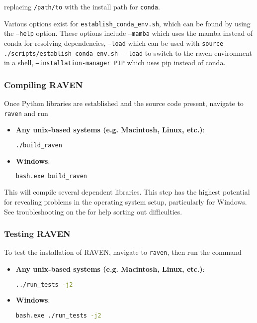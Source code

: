 replacing \texttt{/path/to} with the install path for \texttt{conda}.

\nb Various options exist for \texttt{establish\_conda\_env.sh}, which
can be found by using the \texttt{--help} option.  These options
include \texttt{--mamba} which uses the mamba instead of conda for
resolving dependencies, \texttt{--load} which can be used with
\verb'source ./scripts/establish_conda_env.sh --load' to switch to the
raven environment in a shell, \texttt{--installation-manager PIP} which
uses pip instead of conda.

\subsubsection{Compiling RAVEN}
Once Python libraries are established and the source code present, navigate to \texttt{raven} and run


\begin{itemize}

  \item \textbf{Any unix-based systems (e.g. Macintosh, Linux, etc.)}:
\begin{lstlisting}[language=bash]
./build_raven
\end{lstlisting}
  \item \textbf{Windows}:
  \begin{lstlisting}[language=bash]
bash.exe build_raven
\end{lstlisting}
  
\end{itemize}

This will compile several dependent libraries.  This step has the highest potential for revealing problems in
the operating system setup, particularly for Windows.  See troubleshooting on the \wiki for help sorting out
difficulties.


\subsubsection{Testing RAVEN}
\label{sec:testing raven}
To test the installation of RAVEN, navigate to \texttt{raven}, then run the command

\begin{itemize}

  \item \textbf{Any unix-based systems (e.g. Macintosh, Linux, etc.)}:
\begin{lstlisting}[language=bash]
../run_tests -j2
\end{lstlisting}
  \item \textbf{Windows}:
  \begin{lstlisting}[language=bash]
bash.exe ./run_tests -j2
\end{lstlisting}
  
\end{itemize}

